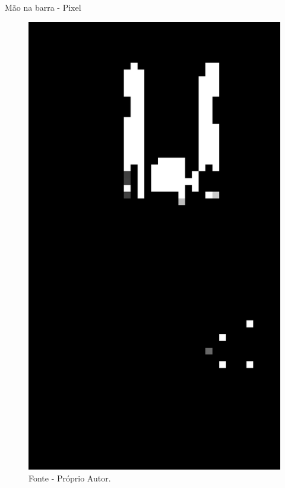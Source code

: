 \begin{frame}{Mão na barra - Pixel}
    \begin{figure}[!ht]
    \centering
    \includegraphics[scale=0.1]{img/desenvolvimento/maoBarra/pixel.png}
    \caption*{Fonte - Próprio Autor.}
    \end{figure}
\end{frame}



